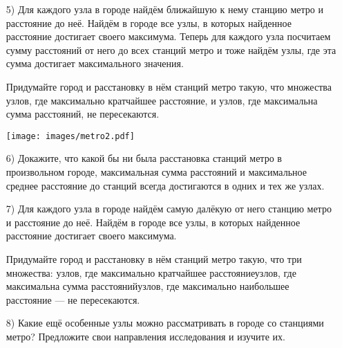 \documentclass[10pt]{scrbook} \usepackage{modules/nonstahp_book}
\begin{document}
\begin{enumerate}

\item [5)] Для каждого узла в городе найдём ближайшую к нему станцию метро и расстояние до неё. Найдём в городе все узлы, в которых найденное расстояние достигает своего максимума. Теперь для каждого узла посчитаем сумму расстояний от него до всех станций метро и тоже найдём узлы, где эта сумма достигает максимального значения.

\smallskip\noindent Придумайте город и расстановку в нём станций метро такую, что множества узлов, где максимально кратчайшее расстояние, и узлов, где максимальна сумма расстояний, не пересекаются.

\vspace{-0.3cm}
\begin{center}
\texttt{[image: images/metro2.pdf]}
\end{center} \vspace{-0.7cm}

\item[6)] Докажите, что какой бы ни была расстановка станций метро в произвольном городе, максимальная сумма расстояний и максимальное среднее расстояние до станций всегда достигаются в одних и тех же узлах.

\item[7)] Для каждого узла в городе найдём самую далёкую от него станцию метро и расстояние до неё. Найдём в городе все узлы, в которых найденное расстояние достигает своего максимума.

\smallskip\noindent Придумайте город и расстановку в нём станций метро такую, что три множества: узлов, где максимально кратчайшее расстояние\scolon узлов, где максимальна сумма расстояний\scolon узлов, где максимально наибольшее расстояние — не пересекаются.

\item[8)] Какие ещё особенные узлы можно рассматривать в городе со станциями метро?  Предложите свои направления исследования и изучите их.

\end{enumerate}
\end{document}
